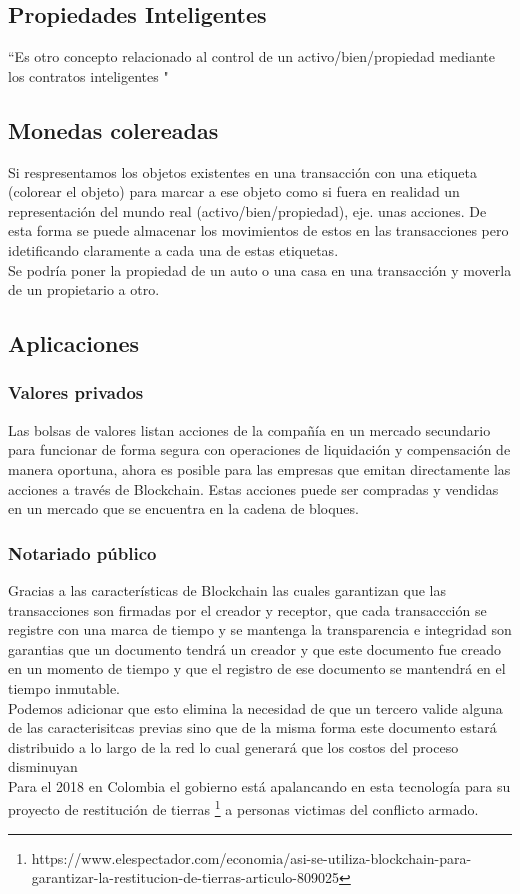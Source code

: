 \subsection{Propiedades Inteligentes}
``Es otro concepto relacionado al control de un activo/bien/propiedad mediante los contratos inteligentes "
\citep{crosby2016blockchain}

\subsection{Monedas colereadas}
Si respresentamos los objetos existentes en una transacción con una etiqueta (colorear el objeto) para marcar a ese objeto como si fuera en realidad un representación del mundo real (activo/bien/propiedad), eje. unas acciones.
De esta forma se puede almacenar los movimientos de estos en las transacciones pero idetificando claramente a cada una de estas etiquetas.
\\
Se podría poner la propiedad de un auto o una casa en una transacción y moverla de un propietario a otro. \citep{crosby2016blockchain}



\subsection{Aplicaciones}

\subsubsection{Valores privados}
Las bolsas de valores listan acciones de la compañía en un mercado secundario para funcionar de forma segura con operaciones de liquidación y compensación de manera oportuna, ahora es posible para las empresas que emitan directamente las acciones a través de Blockchain. Estas acciones puede ser compradas y vendidas en un mercado que se encuentra en la cadena de bloques. \citep{crosby2016blockchain}

\subsubsection{Notariado público}
Gracias a las características de Blockchain las cuales garantizan que las transacciones son firmadas por el creador y receptor, que cada transaccción se registre con una marca de tiempo y se mantenga la transparencia e integridad son garantias que un documento  tendrá un creador y que este documento fue creado en un momento de tiempo y que el registro de ese documento se mantendrá en el tiempo inmutable. \citep{zheng2016blockchain}
\\Podemos adicionar que esto elimina la necesidad de que un tercero valide alguna de las caracterisitcas previas sino que de la misma forma este documento estará distribuido a lo largo de la red lo cual generará que los costos del proceso disminuyan \citep{crosby2016blockchain}
\\
Para el 2018 en Colombia el gobierno está apalancando en esta tecnología para su proyecto de restitución de tierras \footnote{https://www.elespectador.com/economia/asi-se-utiliza-blockchain-para-garantizar-la-restitucion-de-tierras-articulo-809025} a personas victimas del conflicto armado.
